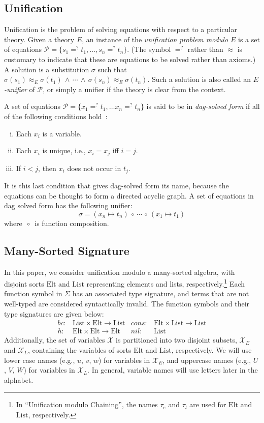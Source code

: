 \documentclass[11pt]{article}
\newcommand{\ueq}{=_{}^?}
\newcommand{\compcirc}{\, {\scriptstyle{\circ}} \,}
\newcommand{\X}{\mathcal{X}}
\newcommand{\p}{\mathcal{P}}
\newcommand{\Elt}{\mathrm{Elt}}
\newcommand{\List}{\mathrm{List}}
\newcommand{\Bc}{\mathit{bc}}
\newcommand{\Hh}{\mathit{h}}
\newcommand{\Cons}{\mathit{cons}}
\newcommand{\Nil}{\mathit{nil}}
\begin{document}
\subsection{Unification}\label{subsection:unification}

Unification is the problem of solving equations with respect to a particular
theory. Given a theory $E$, an instance of the \emph{unification problem modulo
$E$} is a set of equations $\p = \{s_1 \ueq t_1, \dotsc, s_n \ueq t_n\}$. (The
symbol $\ueq$ rather than $\approx$ is customary to indicate that these are
equations to be solved rather than axioms.) A solution is a substitution
$\sigma$ such that $\sigma(s_1) \approx^{}_E \sigma(t_1) \, \wedge \, \dotsb \,
\wedge \, \sigma(s_n) \approx^{}_E \sigma(t_n)$. Such a solution is also called
an \emph{$E$-unifier} of $\p$, or simply a unifier if the theory is clear from
the context.

A set of equations $\p = \{x_1 \ueq t_1, \dotsc x_n \ueq t_n\}$ is said to be
in \emph{dag-solved form} if all of the following conditions
hold~\cite{jouannaud1991solving}:
\begin{enumerate}[(i)]
    \item Each $x_i$ is a variable.
    \item Each $x_i$ is unique, i.e., $x_i = x_j$ iff $i = j$.
    \item If $i < j$, then $x_i$ does not occur in $t_j$.
\end{enumerate}
It is this last condition that gives dag-solved form its name, because the
equations can be thought to form a directed acyclic graph. A set of equations
in dag solved form has the following unifier:
\[\sigma = (x_n \mapsto t_n) \compcirc \dotsb \compcirc (x_1 \mapsto t_1)\]
where $\compcirc$ is function composition.

\subsection{Many-Sorted Signature}\label{subsection:signature}

In this paper, we consider unification modulo a many-sorted algebra, with
disjoint sorts $\Elt$ and $\List$ representing elements and lists,
respectively.\footnote{In ``Unification modulo Chaining'', the names $\tau_e$
and $\tau_l$ are used for $\Elt$ and $\List$, respectively.} Each function
symbol in $\Sigma$ has an associated type signature, and terms that are not
well-typed are considered syntactically invalid. The function symbols and their
type signatures are given below:
\begin{align*}
    \Bc \colon &\List \times \Elt \to \List &
    \Cons \colon &\Elt \times \List \to \List \\
    \Hh \colon &\Elt \times \Elt \to \Elt &
    \Nil \colon &\List
\end{align*}
Additionally, the set of variables $\X$ is partitioned into two disjoint subsets,
$\X_E$ and $\X_L$, containing the variables of sorts $\Elt$ and $\List$, respectively.
We will use lower case names (e.g., $u$, $v$, $w$) for variables in $\X_E$, and
uppercase names (e.g., $U$, $V$, $W$) for variables in $\X_L$. In general, variable
names will use letters later in the alphabet.
\end{document}
